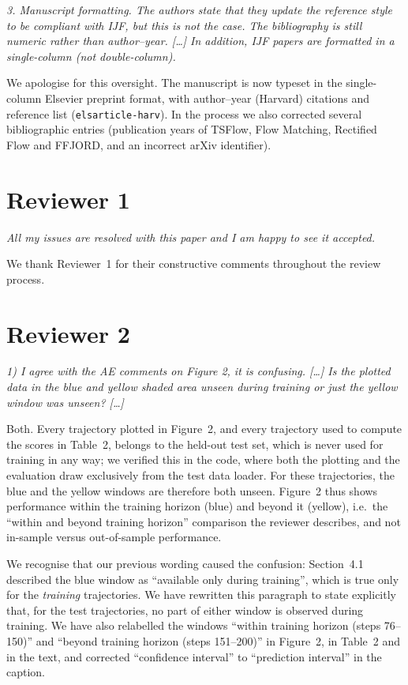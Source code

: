 \documentclass[11pt]{article}
\newcommand{\reviewertext}[1]{%
  \begin{reviewerquote}
    {\color{reviewercolor}\itshape #1}
  \end{reviewerquote}%
}
\newcommand{\authorresponse}[1]{%
    #1\par\medskip
}
\begin{document}
\reviewertext{%
3. Manuscript formatting. The authors state that they update the reference style to be compliant with IJF, but this is not the case. The bibliography is still numeric rather than author--year. [\dots] In addition, IJF papers are formatted in a single-column (not double-column).
}

\authorresponse{%
We apologise for this oversight. The manuscript is now typeset in the single-column Elsevier preprint format, with author--year (Harvard) citations and reference list (\texttt{elsarticle-harv}). In the process we also corrected several bibliographic entries (publication years of TSFlow, Flow Matching, Rectified Flow and FFJORD, and an incorrect arXiv identifier).
}

\section{Reviewer 1}

\reviewertext{%
All my issues are resolved with this paper and I am happy to see it accepted.
}

\authorresponse{%
We thank Reviewer~1 for their constructive comments throughout the review process.
}

\section{Reviewer 2}

\reviewertext{%
1) I agree with the AE comments on Figure 2, it is confusing. [\dots] Is the plotted data in the blue and yellow shaded area unseen during training or just the yellow window was unseen? [\dots]
}

\authorresponse{%
Both. Every trajectory plotted in Figure~2, and every trajectory used to compute the scores in Table~2, belongs to the held-out test set, which is never used for training in any way; we verified this in the code, where both the plotting and the evaluation draw exclusively from the test data loader. For these trajectories, the blue and the yellow windows are therefore both unseen. Figure~2 thus shows performance within the training horizon (blue) and beyond it (yellow), i.e.\ the ``within and beyond training horizon'' comparison the reviewer describes, and not in-sample versus out-of-sample performance.

We recognise that our previous wording caused the confusion: Section~4.1 described the blue window as ``available only during training'', which is true only for the \emph{training} trajectories. We have rewritten this paragraph to state explicitly that, for the test trajectories, no part of either window is observed during training. We have also relabelled the windows ``within training horizon (steps 76--150)'' and ``beyond training horizon (steps 151--200)'' in Figure~2, in Table~2 and in the text, and corrected ``confidence interval'' to ``prediction interval'' in the caption.
}
\end{document}
